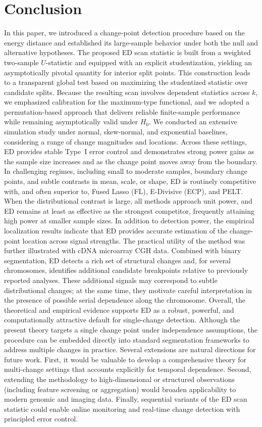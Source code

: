\documentclass[11pt]{article}
\numberwithin{theorem}{section}
\numberwithin{Lemma}{section}
\numberwithin{Definition}{section}
\begin{document}
\section{Conclusion}
In this paper, we introduced a change-point detection procedure based on the energy distance and established its
large-sample behavior under both the null and alternative hypotheses. The proposed ED scan statistic is built from a
weighted two-sample $U$-statistic and equipped with an explicit studentization, yielding an asymptotically pivotal
quantity for interior split points. This construction leads to a transparent global test based on maximizing the
studentized statistic over candidate splits. Because the resulting scan involves dependent statistics across $k$, we
emphasized calibration for the maximum-type functional, and we adopted a permutation-based approach that delivers
reliable finite-sample performance while remaining asymptotically valid under $H_0$. We conducted an extensive simulation study under normal, skew-normal, and exponential baselines, considering a
range of change magnitudes and locations. Across these settings, ED provides stable Type~I error control and
demonstrates strong power gains as the sample size increases and as the change point moves away from the boundary.
In challenging regimes, including small to moderate samples, boundary change points, and subtle contrasts in mean,
scale, or shape, ED is routinely competitive with, and often superior to, Fused Lasso (FL), E-Divisive (ECP), and
PELT. When the distributional contrast is large, all methods approach unit power, and ED remains at least as effective
as the strongest competitor, frequently attaining high power at smaller sample sizes. In addition to detection power,
the empirical localization results indicate that ED provides accurate estimation of the change-point location across
signal strengths. The practical utility of the method was further illustrated with cDNA microarray CGH data. Combined with binary
segmentation, ED detects a rich set of structural changes and, for several chromosomes, identifies additional candidate
breakpoints relative to previously reported analyses. These additional signals may correspond to subtle distributional
changes; at the same time, they motivate careful interpretation in the presence of possible serial dependence along the
chromosome. Overall, the theoretical and empirical evidence supports ED as a robust, powerful, and computationally
attractive default for single-change detection. Although the present theory targets a single change point under independence assumptions, the procedure can be
embedded directly into standard segmentation frameworks to address multiple changes in practice. Several extensions
are natural directions for future work. First, it would be valuable to develop a comprehensive theory for multi-change
settings that accounts explicitly for temporal dependence. Second, extending the methodology to high-dimensional or
structured observations (including feature screening or aggregation) would broaden applicability to modern genomic
and imaging data. Finally, sequential variants of the ED scan statistic could enable online monitoring and real-time
change detection with principled error control.
\end{document}
